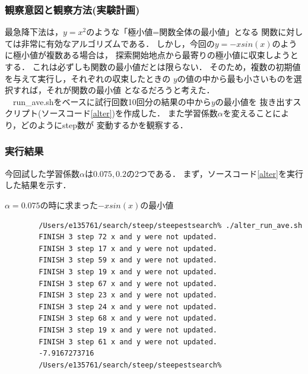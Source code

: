\subsubsection{観察意図と観察方法(実験計画)}
最急降下法は，$y=x^2$のような「極小値=関数全体の最小値」となる
関数に対しては非常に有効なアルゴリズムである．
しかし，今回の$y=-xsin(x)$のように極小値が複数ある場合は，
探索開始地点から最寄りの極小値に収束しようとする．
これは必ずしも関数の最小値だとは限らない．
そのため，複数の初期値を与えて実行し，それぞれの収束したときの
$y$の値の中から最も小さいものを選択すれば，それが関数の最小値
となるだろうと考えた． \\
　run\_ave.shをベースに試行回数10回分の結果の中から$y$の最小値を
抜き出すスクリプト(ソースコード\ref{alter})を作成した．
また学習係数$\alpha$を変えることにより，どのようにstep数が
変動するかを観察する．




\subsubsection{実行結果}
%
今回試した学習係数$\alpha$は$0.075, 0.2$の2つである．
まず，ソースコード\ref{alter}を実行した結果を示す．

\begin{itembox}[c]{$\alpha=0.075$の時に求まった$-xsin(x)$の最小値}
    {\small
        \begin{verbatim}
        /Users/e135761/search/steep/steepestsearch% ./alter_run_ave.sh
        FINISH 3 step 72 x and y were not updated.
        FINISH 3 step 17 x and y were not updated.
        FINISH 3 step 59 x and y were not updated.
        FINISH 3 step 19 x and y were not updated.
        FINISH 3 step 67 x and y were not updated.
        FINISH 3 step 23 x and y were not updated.
        FINISH 3 step 24 x and y were not updated.
        FINISH 3 step 68 x and y were not updated.
        FINISH 3 step 19 x and y were not updated.
        FINISH 3 step 61 x and y were not updated.
        -7.9167273716
        /Users/e135761/search/steep/steepestsearch%
        \end{verbatim}
    }
\end{itembox}

